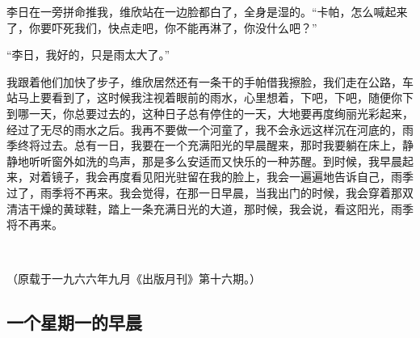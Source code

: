\par 李日在一旁拼命推我，维欣站在一边脸都白了，全身是湿的。“卡帕，怎么喊起来了，你要吓死我们，快点走吧，你不能再淋了，你没什么吧？”
\par “李日，我好的，只是雨太大了。”
\par 我跟着他们加快了步子，维欣居然还有一条干的手帕借我擦脸，我们走在公路，车站马上要看到了，这时候我注视着眼前的雨水，心里想着，下吧，下吧，随便你下到哪一天，你总要过去的，这种日子总有停住的一天，大地要再度绚丽光彩起来，经过了无尽的雨水之后。我再不要做一个河童了，我不会永远这样沉在河底的，雨季终将过去。总有一日，我要在一个充满阳光的早晨醒来，那时我要躺在床上，静静地听听窗外如洗的鸟声，那是多么安适而又快乐的一种苏醒。到时候，我早晨起来，对着镜子，我会再度看见阳光驻留在我的脸上，我会一遍遍地告诉自己，雨季过了，雨季将不再来。我会觉得，在那一日早晨，当我出门的时候，我会穿着那双清洁干燥的黄球鞋，踏上一条充满日光的大道，那时候，我会说，看这阳光，雨季将不再来。
\par  
\par （原载于一九六六年九月《出版月刊》第十六期。）



\subsection{一个星期一的早晨}


